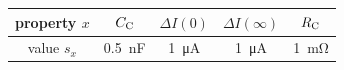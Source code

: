 \begin{frame}
{        \vspace*{1em}%
        \centering
        \begin{tabular}{||c|c|c|c|c||}%
            \hline\rule{0pt}{.75\normalbaselineskip}%
            property $x$ & $C_{\mathrm{C}}$ & $\Delta I\left(0\right)$ & $\Delta I\left(\infty\right)$ & $R_{\mathrm{C}}$ \\[.5ex]\hline\hline%
            value $s_{x}$ & \SI{0.5}{\nano\farad} & \SI{1}{\micro\ampere} & \SI{1}{\micro\ampere} & \SI{1}{\milli\ohm} \\[.5ex]\hline%
        \end{tabular}%
        \vspace*{.5em}%
    }

\end{frame}


